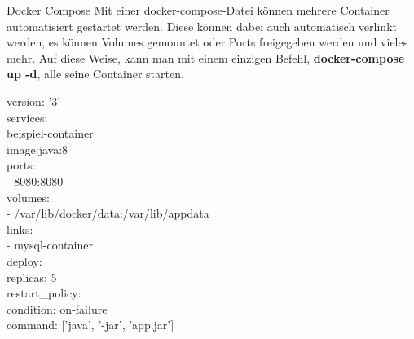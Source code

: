 \documentclass[final]{beamer}
\newlength{\onecolwid}
\newlength{\twocolwid}
\begin{document}
\begin{frame}
\begin{columns}[t]
\begin{column}{\twocolwid}
\begin{columns}[t,totalwidth=\twocolwid]
\begin{column}{\onecolwid}
\begin{block}{Docker Compose}
Mit einer docker-compose-Datei können mehrere Container automatisiert gestartet werden. Diese können dabei auch automatisch verlinkt werden, es können Volumes gemountet oder Ports freigegeben werden und vieles mehr. Auf diese Weise, kann man mit einem einzigen Befehl, \textbf{docker-compose up -d}, alle seine Container starten.
\vspace{2cm}
\par version: \textcolor{docker-db}{'3'} \\
\textcolor{docker-pu}{services:} \\
\hspace{1cm} beispiel-container \\
\hspace{2cm} \textcolor{docker-pu}{image:}java\textcolor{docker-pu}{:}\textcolor{docker-green}{8} \\
\hspace{2cm} \textcolor{docker-pu}{ports:} \\
\hspace{3cm} - \textcolor{docker-green}{8080}\textcolor{docker-pu}{:}\textcolor{docker-green}{8080} \\
\hspace{2cm} \textcolor{docker-pu}{volumes:} \\
\hspace{3cm} - /var/lib/docker/data\textcolor{docker-pu}{:}/var/lib/appdata \\
\hspace{2cm} \textcolor{docker-pu}{links:} \\
\hspace{3cm} - mysql-container \\
\hspace{2cm} \textcolor{docker-pu}{deploy:} \\
\hspace{3cm} \textcolor{docker-pu}{replicas: }\textcolor{docker-green}{5} \\
\hspace{3cm} \textcolor{docker-pu}{restart\_policy:} \\
\hspace{4cm} \textcolor{docker-pu}{condition:} on-failure\\
\hspace{2cm} \textcolor{docker-pu}{command:} [\textcolor{docker-db}{'java'}, \textcolor{docker-db}{'-jar'}, \textcolor{docker-db}{'app.jar'}]\\
\vspace{1.5cm}
\begin{itemize}

\end{itemize}
\end{block}
\end{column}
\end{columns}
\end{column}
\end{columns}
\end{frame}
\end{document}
